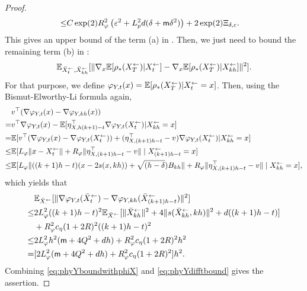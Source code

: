 \begin{proof}
\begin{align}
\leq & 
C \exp(2)
R_\varphi^2 \left(\varepsilon^2+ L_p^2 d(\delta + \mathsf{m} \delta^2) \right)
+ 2 \exp(2) \Xi_{\delta,\varepsilon}. 
    \label{eq:phyYboundwithphiX}
\end{align}
This gives an upper bound of the term (a) in . 
Then, we just need to bound the remaining term (b) in : 
\begin{align}
    \mathbb{E}_{\bar{X}_{t}^\leftarrow,\bar{X}_{kh}^\leftarrow}[ \| \nabla_x \mathbb{E}[\rho_*({X}_{T}^\leftarrow) | {X}_{t}^\leftarrow] 
    -  \nabla_x \mathbb{E}[\rho_*({X}_{T}^\leftarrow) | {X}_{kh}^\leftarrow ] 
    \|^2].
\end{align}
For that purpose, we define $\varphi_{Y,t}(x) = \mathbb{E}[\rho_*({X}_{T}^\leftarrow)| {X}_{t}^\leftarrow = x]$.
Then, using the Bismut-Elworthy-Li formula again, 
\begin{align}
&    v^\top (\nabla \varphi_{Y,t}(x) - \nabla \varphi_{Y,kh}(x)) \\ 
= &  
v^\top \nabla \varphi_{Y,t}(x) - 
\mathbb{E}[ \eta_{{X},h(k+1)-t}^\top \nabla \varphi_{Y,t}({X}_{t}^\leftarrow) |
{X}_{kh}^\leftarrow = x] \\
= &   
\mathbb{E}[ v^\top( \nabla \varphi_{Y,t}(x) - \nabla \varphi_{Y,t}({X}_{t}^\leftarrow))
+ 
(\eta_{{X},(k+1)h - t}^\top - v ) \nabla \varphi_{Y,t}({X}_{t}^\leftarrow) |
{X}_{kh}^\leftarrow = x] \\
\leq &   
\mathbb{E}[ L_\varphi \|x -{X}_{t}^\leftarrow \|
+ 
R_\varphi \|\eta_{{X},(k+1)h-t}^\top - v \|  \mid
{X}_{(k+1)h - t}^\leftarrow = x]  \\
\leq & 
\mathbb{E}[ L_\varphi \| ((k+1)h - t)(x - 2 s(x,kh)) + \sqrt{(h - \delta})B_{kh} \|
+ 
R_\varphi \|\eta_{{X},(k+1)h - t}^\top - v \|  \mid
{X}_{kh}^\leftarrow = x],
\end{align}
which yields that 
\begin{align}
&  \mathbb{E}_{\bar{X}_{\cdot}^\leftarrow}[\|\nabla \varphi_{Y,t}(\bar{X}_{t}^\leftarrow) - \nabla \varphi_{Y,kh}(\bar{X}_{(k+1)h - t}^\leftarrow) \|^2 ] \\
\leq 
& 2 L_\varphi^2((k+1)h - t)^2 \mathbb{E}_{\bar{X}_{\cdot}^\leftarrow}[ \|\bar{X}_{kh}^\leftarrow\|^2
+ 4\| s(\bar{X}_{kh}^\leftarrow,kh)\|^2 + d ((k+1)h - t)]  \\
&
+ R_\varphi^2 c_\eta (1 + 2R)^2 ((k+1)h - t)^2 \\
\leq 
& 
2 L_\varphi^2 h^2 (\mathsf{m} + 4Q^2 + d h)  
+ R_\varphi^2 c_\eta (1 + 2R)^2 h^2 \\
= & 
[2 L_\varphi^2 (\mathsf{m} + 4Q^2 + d h)  
+ R_\varphi^2 c_\eta (1 + 2R)^2] h^2. 
\label{eq:phyYdifftbound}
\end{align}
Combining \eqref{eq:phyYboundwithphiX} and \eqref{eq:phyYdifftbound} gives the assertion. 
\end{proof}



